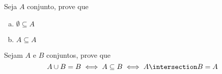 \begin{exercise}
%
Seja $A$ conjunto, prove que
	\begin{enumerate}[a)]
		\item $\emptyset \subseteq A$
		\item $A \subseteq A$
	\end{enumerate}
\end{exercise}

\begin{exercise}
%
Sejam $A$ e $B$ conjuntos, prove que
	$$ A \cup B = B \iff A \subseteq B \iff A \intersection B = A $$
\end{exercise}

